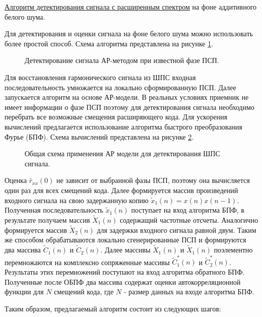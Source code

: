 \underline{Алгоритм детектирования сигнала с расширенным спектром} на фоне аддитивного белого шума.

Для детектирования и оценки сигнала на фоне белого шума можно использовать более простой способ.
Схема алгоритма представлена на рисунке \ref{pic:ar_cdma1_scheme1}.

\begin{figure}[H]
	\center{}
	\caption{Детектирование сигнала АР-методом при известной фазе ПСП.}
	\label{pic:ar_cdma1_scheme1}
\end{figure}

Для восстановления гармонического сигнала из ШПС входная последовательность умножается на локально сформированную ПСП.
Далее запускается алгоритм на основе АР-модели. В реальных условиях приемник не имеет информации о фазе ПСП поэтому для детектирования
сигнала необходимо перебрать все возможные смещения расширяющего кода. Для ускорения вычислений предлагается использование алгоритма быстрого преобразования Фурье (БПФ).
Схема вычислений представлена на рисунке \ref{pic:ar_cdma1_scheme2}.

\begin{figure}[H]
	\center{}
	\caption{Общая схема применения АР модели для детектирования ШПС сигнала.}
	\label{pic:ar_cdma1_scheme2}
\end{figure}

Оценка ${\hat{r}_{xx}(0)}$ не зависит от выбранной фазы ПСП, поэтому она вычисляется один
раз для всех смещений кода. Далее формируется массив произведений входного сигнала на
свою задержанную копию ${\tilde{x}_1(n)=x(n)x(n-1)}$. Полученная последовательность  
${\tilde{x}_1(n)}$ поступает на вход алгоритма БПФ, в результате получаем массив ${\tilde{X}_1(n)}$
содержащий частотные отсчеты. Аналогично формируется массив  ${\tilde{X}_2(n)}$ для
задержки входного сигнала равной двум. Таким же способом обрабатываются локально
сгенерированные ПСП и формируются два массива ${\tilde{C}_1(n)}$ и ${\tilde{C}_2(n)}$.
Далее массивы ${\tilde{X}_1(n)}$ и ${\tilde{X}_1(n)}$ поэлементно перемножаются
на комплексно сопряженные массивы ${\tilde{C}_1^*(n)}$ и ${\tilde{C}_2^*(n)}$.
Результаты этих перемножений поступают на вход алгоритма обратного
БПФ. Полученные после ОБПФ два массива содержат оценки автокорреляционной функции для ${N}$ 
смещений кода, где  ${N}$ - размер данных на входе алгоритма БПФ.

Таким образом, предлагаемый алгоритм состоит из следующих шагов:

